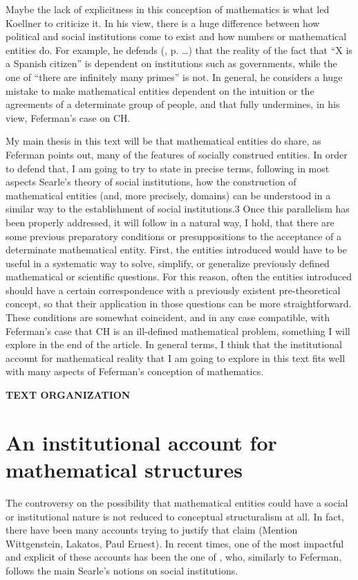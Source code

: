 \documentclass[11pt,a4paper]{article}
\begin{document}
Maybe the lack of explicitness in this conception of mathematics is what led Koellner to criticize it. In his view, there is a huge difference between how political and social institutions come to exist and how numbers or mathematical entities do. For example, he defends (\citeyear{Koellner2022}, p. …) that the reality of the fact that “X is a Spanish citizen” is dependent on institutions such as governments, while the one of “there are infinitely many primes” is not. In general, he considers a huge mistake to make mathematical entities dependent on the intuition or the agreements of a determinate group of people, and that fully undermines, in his view, Feferman's case on CH. 

My main thesis in this text will be that mathematical entities do share, as Feferman points out, many of the features of socially construed entities. In order to defend that, I am going to try to state in precise terms, following in most aspects Searle's theory of social institutions, how the construction of mathematical entities (and, more precisely, domains) can be understood in a similar way to the establishment of social institutions.3 Once this parallelism has been properly addressed, it will follow in a natural way, I hold, that there are some previous preparatory conditions or presuppositions to the acceptance of a determinate mathematical entity. First, the entities introduced would have to be useful in a systematic way to solve, simplify, or generalize previously defined mathematical or scientific questions. For this reason, often the entities introduced should have a certain correspondence with a previously existent pre-theoretical concept, so that their application in those questions can be more straightforward. These conditions are somewhat coincident, and in any case compatible, with Feferman's case that CH is an ill-defined mathematical problem, something I will explore in the end of the article. In general terms, I think that the institutional account for mathematical reality that I am going to explore in this text fits well with many aspects of Feferman's conception of mathematics. 

\textbf{TEXT ORGANIZATION}

\section{An institutional account for mathematical structures}

The controversy on the possibility that mathematical entities could have a social or institutional nature is not reduced to conceptual structuralism at all. In fact, there have been many accounts trying to justify that claim (Mention Wittgenstein, Lakatos, Paul Ernest). In recent times, one of the most impactful and explicit of these accounts has been the one of \textcite{Cole2013, Cole2008MathematicalDomains}, who, similarly to Feferman, follows the main Searle's notions on  social institutions. 
\end{document}

